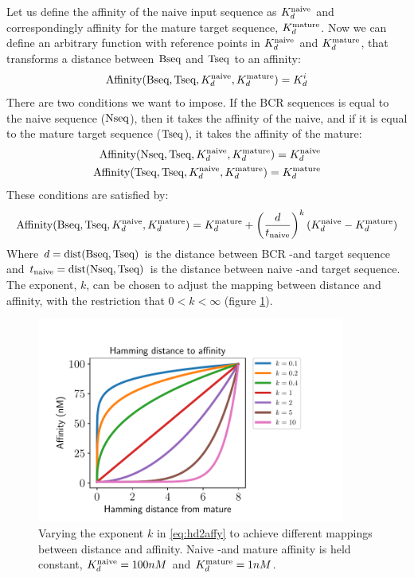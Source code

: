 Let us define the affinity of the naive input sequence as $K^{\text{naive}}_d$ and correspondingly affinity for the mature target sequence, $K^{\text{mature}}_d$.
Now we can define an arbitrary function with reference points in $K^{\text{naive}}_d$ and $K^{\text{mature}}_d$, that transforms a distance between $\text{Bseq}$ and $\text{Tseq}$ to an affinity:
$$
\text{Affinity}(\text{Bseq}, \text{Tseq}, K^{\text{naive}}_d, K^{\text{mature}}_d) = K^i_d
$$
There are two conditions we want to impose.
If the BCR sequences is equal to the naive sequence ($\text{Nseq}$), then it takes the affinity of the naive, and if it is equal to the mature target sequence ($\text{Tseq}$), it takes the affinity of the mature:
\begin{equation}
\begin{split}
\text{Affinity}(\text{Nseq}, \text{Tseq}, K^{\text{naive}}_d, K^{\text{mature}}_d) = K^{\text{naive}}_d \\
\text{Affinity}(\text{Tseq}, \text{Tseq}, K^{\text{naive}}_d, K^{\text{mature}}_d) = K^{\text{mature}}_d
\end{split}
\label{eq:hd2affy_cond}
\end{equation}
These conditions are satisfied by:
\begin{equation}
\text{Affinity}(\text{Bseq}, \text{Tseq}, K^{\text{naive}}_d, K^{\text{mature}}_d) = K^{\text{mature}}_d + \left ( \frac{d}{t_{\text{naive}}} \right )^k (K^{\text{naive}}_d - K^{\text{mature}}_d)
\label{eq:hd2affy}
\end{equation}
Where $d = \operatorname{dist}(\text{Bseq}, \text{Tseq})$ is the distance between BCR -and target sequence and $t_{\text{naive}} = \operatorname{dist}(\text{Nseq}, \text{Tseq})$ is the distance between naive -and target sequence.
The exponent, $k$, can be chosen to adjust the mapping between distance and affinity, with the restriction that $0 < k < \infty$ (figure \ref{fig:hd2affy}).
\begin{figure}
    \centering
    \includegraphics[width=0.9\textwidth]{figures/hd2affy.pdf}
    \caption{
        \label{fig:hd2affy}
        Varying the exponent $k$ in \eqref{eq:hd2affy} to achieve different mappings between distance and affinity. Naive -and mature affinity is held constant, $K^{\text{naive}}_d = 100nM$ and $K^{\text{mature}}_d = 1nM$.
    }
\end{figure}

